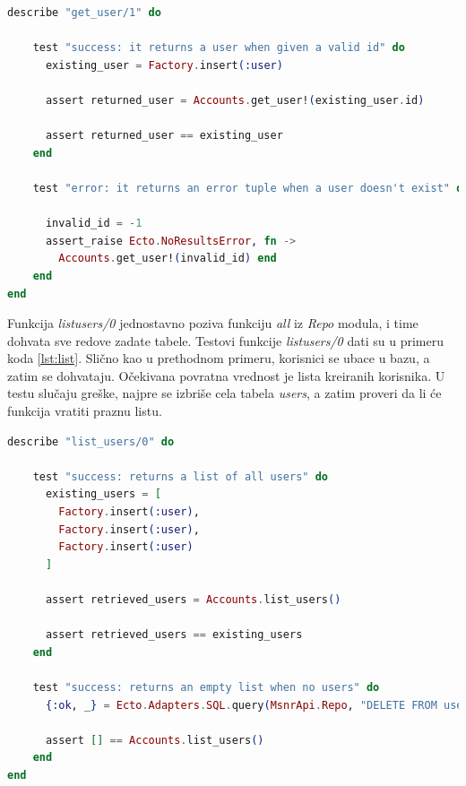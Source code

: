 \documentclass[12pt,oneside]{memoir}
\begin{document}
\begin{lstlisting}[language=elixir, caption={Testiranje funkcije \emph{get{\textunderscore}user/1}},captionpos=b, label={lst:get}]
describe "get_user/1" do

    test "success: it returns a user when given a valid id" do
      existing_user = Factory.insert(:user)

      assert returned_user = Accounts.get_user!(existing_user.id)

      assert returned_user == existing_user
    end

    test "error: it returns an error tuple when a user doesn't exist" do

      invalid_id = -1
      assert_raise Ecto.NoResultsError, fn ->
        Accounts.get_user!(invalid_id) end
    end
end
\end{lstlisting}

\par Funkcija \emph{list{\textunderscore}users/0} jednostavno poziva funkciju \emph{all} iz \emph{Repo} modula, i time dohvata sve redove zadate tabele. Testovi funkcije \emph{list{\textunderscore}users/0} dati su u primeru koda \ref{lst:list}. Slično kao u prethodnom primeru, korisnici se ubace u bazu, a zatim se dohvataju. Očekivana povratna vrednost je lista kreiranih korisnika. U testu slučaju greške, najpre se izbriše cela tabela \emph{users}, a zatim proveri da li će funkcija vratiti praznu listu. 

\begin{lstlisting}[language=elixir, caption={Testiranje funkcije \emph{list{\textunderscore}users/0}},captionpos=b, label={lst:list}]
describe "list_users/0" do

    test "success: returns a list of all users" do
      existing_users = [
        Factory.insert(:user),
        Factory.insert(:user),
        Factory.insert(:user)
      ]

      assert retrieved_users = Accounts.list_users()

      assert retrieved_users == existing_users
    end

    test "success: returns an empty list when no users" do
      {:ok, _} = Ecto.Adapters.SQL.query(MsnrApi.Repo, "DELETE FROM users")

      assert [] == Accounts.list_users()
    end
end
\end{lstlisting}
\end{document}
